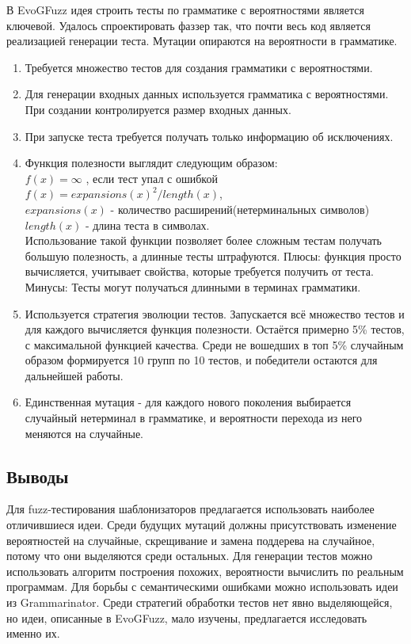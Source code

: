 \documentclass[a4paper]{article}
\begin{document}
В EvoGFuzz\cite{litlink2} идея строить тесты по грамматике с вероятностями является ключевой. Удалось спроектировать фаззер так, что почти весь код является реализацией генерации теста. Мутации опираются на вероятности в грамматике. 
\begin{enumerate}
    \item Требуется множество тестов для создания грамматики с вероятностями.
    \item Для генерации входных данных используется грамматика с вероятностями. При создании контролируется размер входных данных. 
    \item При запуске теста требуется получать только информацию об исключениях.
    \item Функция полезности выглядит следующим образом:\\
    $f(x) = \infty$ , если тест упал с ошибкой\\
    $f(x) = expansions(x) ^ 2 / length(x) $,\\
    $expansions(x)$ - количество расширений(нетерминальных символов) \\
    $length(x)$ - длина теста в символах.\\
    Использование такой функции позволяет более сложным тестам получать большую полезность, а длинные тесты штрафуются. 
    Плюсы: функция просто вычисляется, учитывает свойства, которые требуется получить от теста.
    Минусы: Тесты могут получаться длинными в терминах грамматики.
    \item Используется стратегия эволюции тестов. Запускается всё множество тестов и для каждого вычисляется функция полезности. Остаётся примерно 5\% тестов, с максимальной функцией качества. Среди не вошедших в топ 5\% случайным образом формируется 10 групп по 10 тестов, и победители остаются для дальнейшей работы.
    \item Единственная мутация - для каждого нового поколения выбирается случайный нетерминал в грамматике, и вероятности перехода из него меняются на случайные.
\end{enumerate}

\subsection{Выводы}
\indent

Для fuzz-тестирования шаблонизаторов предлагается использовать наиболее отличившиеся идеи. Среди будущих мутаций должны присутствовать изменение вероятностей на случайные, скрещивание и замена поддерева на случайное, потому что они выделяются среди остальных. Для генерации тестов можно использовать алгоритм построения похожих, вероятности вычислить по реальным программам. Для борьбы с семантическими ошибками можно использовать идеи из Grammarinator. Среди стратегий обработки тестов нет явно выделяющейся, но идеи, описанные в EvoGFuzz, мало изучены, предлагается исследовать именно их.
\end{document}
